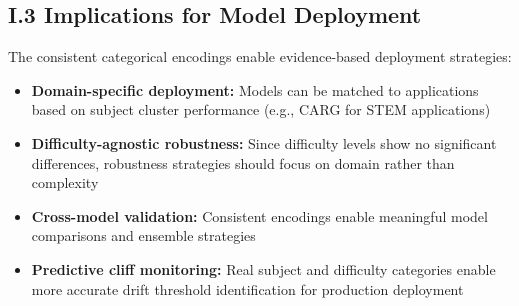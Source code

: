 \documentclass[letterpaper]{article}
\begin{document}
\subsection*{I.3 Implications for Model Deployment}

The consistent categorical encodings enable evidence-based deployment strategies:

\begin{itemize}
\item \textbf{Domain-specific deployment:} Models can be matched to applications based on subject cluster performance (e.g., CARG for STEM applications)
\item \textbf{Difficulty-agnostic robustness:} Since difficulty levels show no significant differences, robustness strategies should focus on domain rather than complexity
\item \textbf{Cross-model validation:} Consistent encodings enable meaningful model comparisons and ensemble strategies
\item \textbf{Predictive cliff monitoring:} Real subject and difficulty categories enable more accurate drift threshold identification for production deployment
\end{itemize}
\end{document}
